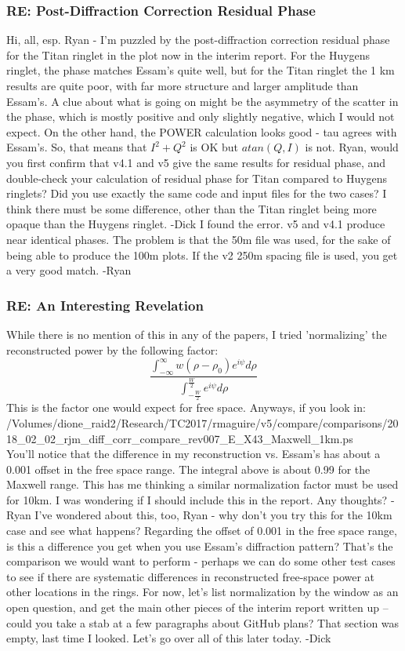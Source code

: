 \documentclass[crop=false,class=book]{standalone}
\begin{document}
\subsubsection{\footnotesize RE: Post-Diffraction Correction Residual Phase}
Hi, all, esp. Ryan - I'm puzzled by the post-diffraction correction residual phase for the Titan ringlet in the plot now in the interim report. For the Huygens ringlet, the phase matches Essam's quite well, but for the Titan ringlet the 1 km results are quite poor, with far more structure and larger amplitude than Essam's. A clue about what is going on might be the asymmetry of the scatter in the phase, which is mostly positive and only slightly negative, which I would not expect. On the other hand, the POWER calculation looks good - tau agrees with Essam's. So, that means that $I^{2}+Q^{2}$ is OK but $atan(Q,I)$ is not. Ryan, would you first confirm that v4.1 and v5 give the same results for residual phase, and double-check your calculation of residual phase for Titan compared to Huygens ringlets? Did you use exactly the same code and input files for the two cases? I think there must be some difference, other than the Titan ringlet being more opaque than the Huygens ringlet. -Dick
I found the error. v5 and v4.1 produce near identical phases. The problem is that the 50m file was used, for the sake of being able to produce the 100m plots. If the v2 250m spacing file is used, you get a very good match. -Ryan
\subsubsection{\footnotesize RE: An Interesting Revelation}
While there is no mention of this in any of the papers, I tried 'normalizing' the reconstructed power by the following factor:
\begin{equation*}
    \frac{\int_{-\infty}^{\infty}w(\rho-\rho_{0})e^{i\psi}d\rho}{\int_{-\frac{W}{2}}^{\frac{W}{2}}e^{i\psi}d\rho}
\end{equation*}
This is the factor one would expect for free space. Anyways, if you look in:\\
/Volumes/dione\_raid2/Research/TC2017/rmaguire/v5/compare/comparisons/2018\_02\_02\_rjm\_diff\_corr\_compare\_rev007\_E\_X43\_Maxwell\_1km.ps\\
You'll notice that the difference in my reconstruction vs. Essam's has about a 0.001 offset in the free space range. The integral above is about 0.99 for the Maxwell range. This has me thinking a similar normalization factor must be used for 10km. I was wondering if I should include this in the report. Any thoughts? -Ryan
I've wondered about this, too, Ryan - why don't you try this for the 10km case and see what happens? Regarding the offset of 0.001 in the free space range, is this a difference you get when you use Essam's diffraction pattern? That's the comparison we would want to perform - perhaps we can do some other test cases to see if there are systematic differences in reconstructed free-space power at other locations in the rings. For now, let's list normalization by the window as an open question, and get the main other pieces of the interim report written up -- could you take a stab at a few paragraphs about GitHub plans? That section was empty, last time I looked. Let's go over all of this later today. -Dick
\end{document}
